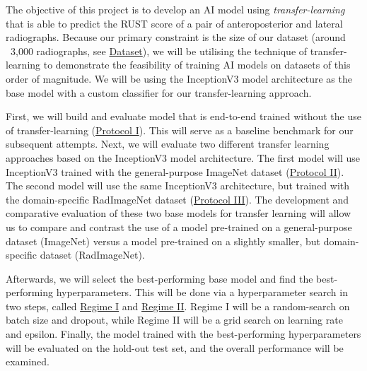 
The objective of this project is to develop an AI model using \emph{transfer-learning} that is able to predict the RUST score of a pair of anteroposterior and lateral radiographs. Because our primary constraint is the size of our dataset (around ~3,000 radiographs, see \hyperref[sec:dataset]{Dataset}), we will be utilising the technique of transfer-learning to demonstrate the feasibility of training AI models on datasets of this order of magnitude. We will be using the InceptionV3 model architecture \autocite{inceptionv3} as the base model with a custom classifier for our transfer-learning approach. 

First, we will build and evaluate model that is end-to-end trained without the use of transfer-learning (\hyperref[sec:protocol-i-method]{Protocol I}). This will serve as a baseline benchmark for our subsequent attempts.
Next, we will evaluate two different transfer learning approaches based on the InceptionV3 model architecture. The first model will use InceptionV3 trained with the general-purpose ImageNet dataset \autocite{imagenet} (\hyperref[sec:protocol-ii-method]{Protocol II}). The second model will use the same InceptionV3 architecture, but trained with the domain-specific RadImageNet dataset \autocite{radimagenet} (\hyperref[sec:protocol-iii-method]{Protocol III}). The development and comparative evaluation of these two base models for transfer learning will allow us to compare and contrast the use of a model pre-trained on a general-purpose dataset (ImageNet) versus a model pre-trained on a slightly smaller, but domain-specific dataset (RadImageNet). 

Afterwards, we will select the best-performing base model and find the best-performing hyperparameters. This will be done via a hyperparameter search in two steps, called \hyperref[sec:regime-i]{Regime I} and \hyperref[sec:regime-ii]{Regime II}. Regime I will be a random-search on batch size and dropout, while Regime II will be a grid search on learning rate and epsilon. Finally, the model trained with the best-performing hyperparameters will be evaluated on the hold-out test set, and the overall performance will be examined.

